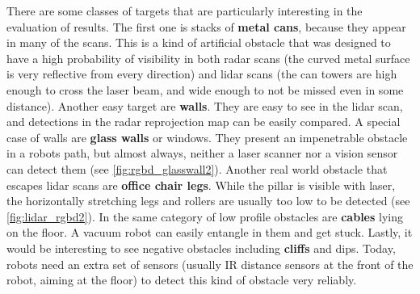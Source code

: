 There are some classes of targets that are particularly interesting in the evaluation of results. The first one is stacks of \textbf{metal cans}, because they appear in many of the scans. This is a kind of artificial obstacle that was designed to have a high probability of visibility in both radar scans (the curved metal surface is very reflective from every direction) and lidar scans (the can towers are high enough to cross the laser beam, and wide enough to not be missed even in some distance). Another easy target are \textbf{walls}. They are easy to see in the lidar scan, and detections in the radar reprojection map can be easily compared. A special case of walls are \textbf{glass walls} or windows. They present an impenetrable obstacle in a robots path, but almost always, neither a laser scanner nor a vision sensor can detect them (see \cref{fig:rgbd_glasswall2}). Another real world obstacle that escapes lidar scans are \textbf{office chair legs}. While the pillar is visible with laser, the horizontally stretching legs and rollers are usually too low to be detected (see \cref{fig:lidar_rgbd2}). In the same category of low profile obstacles are \textbf{cables} lying on the floor. A vacuum robot can easily entangle in them and get stuck. Lastly, it would be interesting to see negative obstacles including \textbf{cliffs} and dips. Today, robots need an extra set of sensors (usually IR distance sensors at the front of the robot, aiming at the floor) to detect this kind of obstacle very reliably.

